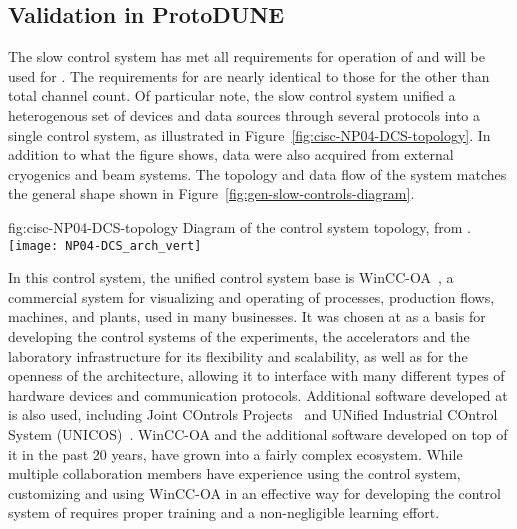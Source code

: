\subsection{Validation in ProtoDUNE}
\label{sec:cisc-slow-control-pdsp}

The  slow control system has met
all requirements for operation of \cite{pdspdcs_proc} and will be used for .  The requirements for  are
nearly identical to those for the  other than
total channel count. Of particular note, the  slow control system unified a heterogenous set of devices and data sources
through several protocols into a
single control system, as illustrated in
Figure~\ref{fig:cisc-NP04-DCS-topology}. In addition to what
the figure shows, data were also acquired from external cryogenics and beam
systems.  The topology and data flow of the system matches the general
shape shown in Figure~\ref{fig:gen-slow-controls-diagram}.

\begin{dunefigure}{fig:cisc-NP04-DCS-topology}
{Diagram of the  control system topology, from \cite{pdspdcs_proc}.}
\texttt{[image: NP04-DCS\_arch\_vert]}
\end{dunefigure}

In this control system, the unified control system base is WinCC-OA~\cite{winccoa}, a commercial  system for visualizing and operating of processes, production flows, machines, and plants, used
in many businesses. It was chosen at  as a basis for
developing the control systems of the  experiments, the
accelerators and the laboratory infrastructure for its flexibility and
scalability, as well as for the openness of the architecture, allowing
it to interface with many different types of hardware devices and
communication protocols. Additional software developed at 
is also used, including Joint COntrols Projects~\cite{jcop} and UNified
Industrial COntrol System (UNICOS)~\cite{unicos}.  WinCC-OA and the
additional software developed on top of it in the past 20 years, have
grown into a fairly complex ecosystem. While multiple collaboration
members have experience using the  control system,
customizing and using WinCC-OA in an effective way for developing the
control system of  requires proper training and a
non-negligible learning effort.


